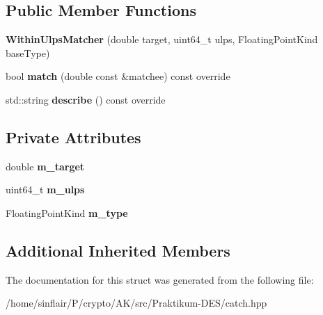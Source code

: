 \subsection*{Public Member Functions}
\begin{DoxyCompactItemize}
\item 
\mbox{\label{structCatch_1_1Matchers_1_1Floating_1_1WithinUlpsMatcher_a0d29702ebd6ab7b679c9ce275514fe1e}} 
{\bfseries Within\+Ulps\+Matcher} (double target, uint64\+\_\+t ulps, Floating\+Point\+Kind base\+Type)
\item 
\mbox{\label{structCatch_1_1Matchers_1_1Floating_1_1WithinUlpsMatcher_aabda42a0dc5d00f3c5916feb75006b32}} 
bool {\bfseries match} (double const \&matchee) const override
\item 
\mbox{\label{structCatch_1_1Matchers_1_1Floating_1_1WithinUlpsMatcher_ad9bc8bb7f3abd326580a4bf6cf369b1b}} 
std\+::string {\bfseries describe} () const override
\end{DoxyCompactItemize}
\subsection*{Private Attributes}
\begin{DoxyCompactItemize}
\item 
\mbox{\label{structCatch_1_1Matchers_1_1Floating_1_1WithinUlpsMatcher_a97b0112726f510af8ca22cb490c2b14d}} 
double {\bfseries m\+\_\+target}
\item 
\mbox{\label{structCatch_1_1Matchers_1_1Floating_1_1WithinUlpsMatcher_a78fbf35cf9419ff31deb9432e314c1e3}} 
uint64\+\_\+t {\bfseries m\+\_\+ulps}
\item 
\mbox{\label{structCatch_1_1Matchers_1_1Floating_1_1WithinUlpsMatcher_ac5dc48ae38dbfe143647d450f03771ab}} 
Floating\+Point\+Kind {\bfseries m\+\_\+type}
\end{DoxyCompactItemize}
\subsection*{Additional Inherited Members}


The documentation for this struct was generated from the following file\+:\begin{DoxyCompactItemize}
\item 
/home/sinflair/\+P/crypto/\+A\+K/src/\+Praktikum-\/\+D\+E\+S/catch.\+hpp\end{DoxyCompactItemize}
